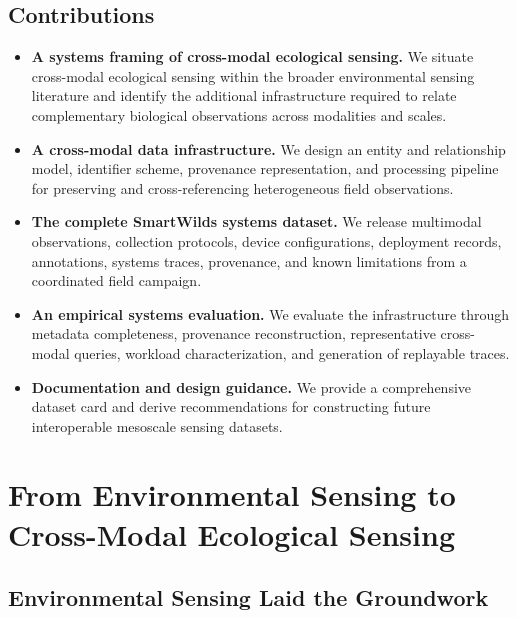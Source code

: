 \documentclass[manuscript]{acmart}
\begin{document}
\subsection{Contributions}

\begin{itemize}
    \item \textbf{A systems framing of cross-modal ecological sensing.}
    We situate cross-modal ecological sensing within the broader
    environmental sensing literature and identify the additional
    infrastructure required to relate complementary biological
    observations across modalities and scales.

    \item \textbf{A cross-modal data infrastructure.}
    We design an entity and relationship model, identifier scheme,
    provenance representation, and processing pipeline for preserving
    and cross-referencing heterogeneous field observations.

    \item \textbf{The complete SmartWilds systems dataset.}
    We release multimodal observations, collection protocols, device
    configurations, deployment records, annotations, systems traces,
    provenance, and known limitations from a coordinated field
    campaign.

    \item \textbf{An empirical systems evaluation.}
    We evaluate the infrastructure through metadata completeness,
    provenance reconstruction, representative cross-modal queries,
    workload characterization, and generation of replayable traces.

    \item \textbf{Documentation and design guidance.}
    We provide a comprehensive dataset card and derive recommendations
    for constructing future interoperable mesoscale sensing datasets.
\end{itemize}

\newpage
\section{From Environmental Sensing to Cross-Modal Ecological Sensing}
\label{sec:context}

\subsection{Environmental Sensing Laid the Groundwork}
\end{document}

